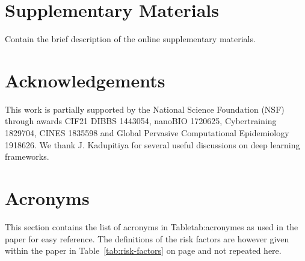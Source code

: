 \documentclass[letterpaper, inpress]{jds} %
\renewcommand{\_}{%
    \textunderscore\hspace{0pt}%
}
\begin{document}

%
%

\section*{Supplementary Materials}

Contain
the brief description of the online supplementary materials.

%
%

\section*{Acknowledgements}

This work is partially supported by the National Science Foundation
(NSF) through awards CIF21 DIBBS 1443054, nanoBIO 1720625,
Cybertraining 1829704, CINES 1835598 and Global Pervasive
Computational Epidemiology 1918626.  We thank J. Kadupitiya for
several useful discussions on deep learning frameworks.

\clearpage

\section*{Acronyms}

This section contains the list of acronyms in Table{tab:acronymes} as used in the paper for easy
reference. The definitions of the risk factors are however given
within the paper in Table~\ref{tab:risk-factors} on page
\pageref{tab:risk-factors} and not repeated here.
\end{document}
